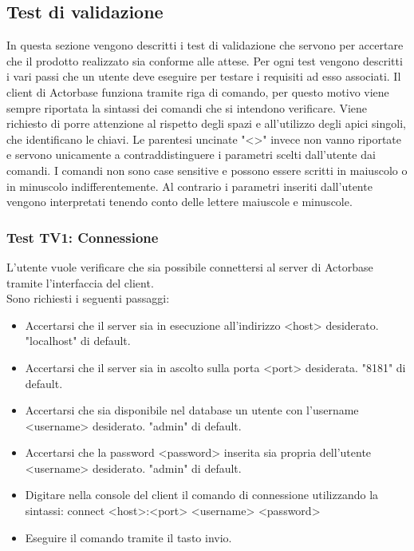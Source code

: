 \documentclass[a4paper]{article}
\begin{document}
	\subsection{Test di validazione}
		In questa sezione vengono descritti i test di validazione che servono per accertare che il prodotto realizzato sia conforme alle attese. 
		Per ogni test vengono descritti i vari passi che un utente deve eseguire per testare i requisiti ad esso associati.
		Il client di Actorbase funziona tramite riga di comando, per questo motivo viene sempre riportata la sintassi dei comandi che si intendono verificare.
		Viene richiesto di porre attenzione al rispetto degli spazi e all'utilizzo degli apici singoli, che identificano le chiavi.
		Le parentesi uncinate "<>" invece non vanno riportate e servono unicamente a contraddistinguere i parametri scelti dall'utente dai comandi.
		I comandi non sono case sensitive e possono essere scritti in maiuscolo o in minuscolo indifferentemente. 
		Al contrario i parametri inseriti dall'utente vengono interpretati tenendo conto delle lettere maiuscole e minuscole.
		
		\subsubsection{Test TV1: Connessione}
		L'utente vuole verificare che sia possibile connettersi al server di Actorbase tramite l'interfaccia del client. \\
		Sono richiesti i seguenti passaggi:
		\begin{itemize}
			\item Accertarsi che il server sia in esecuzione all'indirizzo <host> desiderato. "localhost" di default.
			\item Accertarsi che il server sia in ascolto sulla porta <port> desiderata. "8181" di default.
			\item Accertarsi che sia disponibile nel database un utente con l'username <username> desiderato. "admin" di default.
			\item Accertarsi che la password <password> inserita sia propria dell'utente <username> desiderato. "admin" di default.
			\item Digitare nella console del client il comando di connessione utilizzando la sintassi: connect <host>:<port> <username> <password>
			\item Eseguire il comando tramite il tasto invio.
		\end{itemize}
		
\end{document}
